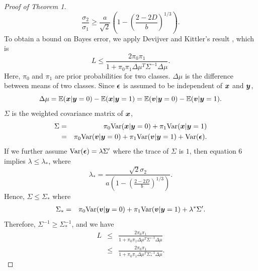 \documentclass{article}
\begin{document}
\begin{proof}[Proof of Theorem 1]
\begin{equation}
	\frac{ \sigma_2}{\sigma_1} \geq\frac{a}{\sqrt{2}} (1-(\frac{2-2D}{b})^{1/3} ).
	\end{equation}	
	To obtain a bound on Bayes error, we apply Devijver and Kittler's result \cite{devijver1982pattern}, which is
	\[L \leq \frac{2\pi_0\pi_1}{1+\pi_0\pi_1\Delta\mu^T\Sigma^{-1}\Delta\mu}.\]
	Here, $\pi_0$ and $\pi_1$ are prior probabilities for two classes. $\Delta\mu$ is the difference between means of two classes. Since $\boldsymbol{\epsilon}$ is assumed to be independent of $\boldsymbol{x}$ and $\boldsymbol{y}$,
	\[\Delta\mu= \mathbb{E}(\boldsymbol{x}|\boldsymbol{y}=0)-\mathbb{E}(\boldsymbol{x}|\boldsymbol{y}=1)=\mathbb{E}(\boldsymbol{v}|\boldsymbol{y}=0)-\mathbb{E}(\boldsymbol{v}|\boldsymbol{y}=1).\]
	$\Sigma$ is the weighted covariance matrix of $\boldsymbol{x}$,
	\begin{eqnarray*}
		\Sigma &=& \pi_0\text{Var}(\boldsymbol{x}|\boldsymbol{y}=0)+\pi_1\text{Var}(\boldsymbol{x}|\boldsymbol{y}=1)\\
		&=& \pi_0\text{Var}(\boldsymbol{v}|\boldsymbol{y}=0)+\pi_1\text{Var}(\boldsymbol{v}|\boldsymbol{y}=1)+\text{Var}(\boldsymbol{\epsilon}) .\\ 
	\end{eqnarray*}
	If we further assume $\text{Var}(\boldsymbol{\epsilon}) = \lambda \Sigma'$ where the trace of $\Sigma$ is $1$, then equation 6 implies $\lambda\leq\lambda_*$, where
	\[\lambda_*=\frac{\sqrt{2}\sigma_2}{a(1-(\frac{2-2D}{b})^{1/3} )}.\]
	Hence, 	$\Sigma \leq \Sigma_*$ where
	\begin{eqnarray*}
		\Sigma_*&=& \pi_0\text{Var}(\boldsymbol{v}|\boldsymbol{y}=0)+\pi_1\text{Var}(\boldsymbol{v}|\boldsymbol{y}=1)+\lambda^*\Sigma'.
	\end{eqnarray*}
	Therefore, $\Sigma^{-1} \geq \Sigma_*^{-1}$, and we have
	\begin{eqnarray*}
		L &\leq& \frac{2\pi_0\pi_1}{1+\pi_0\pi_1\Delta\mu^T\Sigma^{-1}\Delta\mu} \\
		&\leq& \frac{2\pi_0\pi_1}{1+\pi_0\pi_1\Delta\mu^T\Sigma_*^{-1}\Delta\mu}.
	\end{eqnarray*}
\end{proof}
\end{document}
